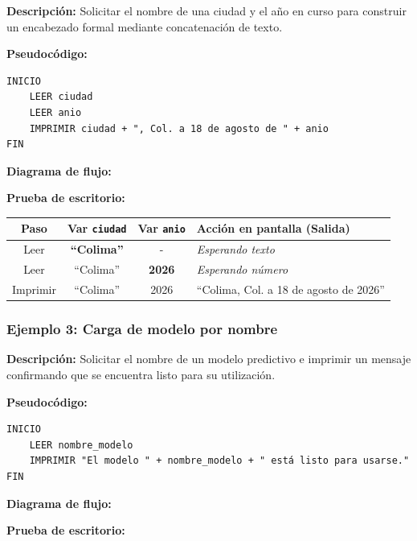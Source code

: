 \textbf{Descripción:} Solicitar el nombre de una ciudad y el año en
curso para construir un encabezado formal mediante concatenación de
texto.

\textbf{Pseudocódigo:}

\begin{verbatim}
INICIO
    LEER ciudad
    LEER anio
    IMPRIMIR ciudad + ", Col. a 18 de agosto de " + anio
FIN
\end{verbatim}

\textbf{Diagrama de flujo:}



\textbf{Prueba de escritorio:}

{\def\LTcaptype{none} %
\begin{longtable}[]{@{}cccl@{}}
\toprule\noalign{}
Paso & Var \texttt{ciudad} & Var \texttt{anio} & Acción en pantalla
(Salida) \\
\midrule\noalign{}
\endhead
\bottomrule\noalign{}
\endlastfoot
Leer & \textbf{``Colima''} & - & \emph{Esperando texto} \\
Leer & ``Colima'' & \textbf{2026} & \emph{Esperando número} \\
Imprimir & ``Colima'' & 2026 & ``Colima, Col. a 18 de agosto de
2026'' \\
\end{longtable}
}

\subsubsection{Ejemplo 3: Carga de modelo por
nombre}\label{ejemplo-3-carga-de-modelo-por-nombre}

\textbf{Descripción:} Solicitar el nombre de un modelo predictivo e
imprimir un mensaje confirmando que se encuentra listo para su
utilización.

\textbf{Pseudocódigo:}

\begin{verbatim}
INICIO
    LEER nombre_modelo
    IMPRIMIR "El modelo " + nombre_modelo + " está listo para usarse."
FIN
\end{verbatim}

\textbf{Diagrama de flujo:}



\textbf{Prueba de escritorio:}

